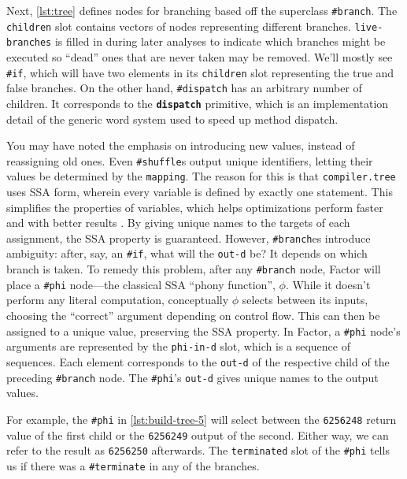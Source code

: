 

\begin{sloppypar}
Next, \vref{lst:tree} defines nodes for branching based off the superclass
\Verb|#branch|.  The \Verb|children| slot contains vectors of nodes
representing different branches.  \Verb|live-branches| is filled in during
later analyses to indicate which branches might be executed so ``dead'' ones
that are never taken may be removed.  We'll mostly see \Verb|#if|, which will
have two elements in its \Verb|children| slot representing the true and false
branches.  On the other hand, \Verb|#dispatch| has an arbitrary number of
children.  It corresponds to the \texttt{\textbf{dispatch}} primitive, which is
an implementation detail of the generic word system used to speed up method
dispatch.
\end{sloppypar}

You may have noted the emphasis on introducing new values, instead of
reassigning old ones.  Even \Verb|#shuffle|s output unique identifiers, letting
their values be determined by the \Verb|mapping|.  The reason for this is that
\Verb|compiler.tree| uses \gls{SSA} form, wherein every variable is defined by
exactly one statement.  This simplifies the properties of variables, which
helps optimizations perform faster and with better results \autocite{SSA}.  By
giving unique names to the targets of each assignment, the \gls{SSA} property
is guaranteed.  However, \Verb|#branch|es introduce ambiguity: after, say, an
\Verb|#if|, what will the \Verb|out-d| be?  It depends on which branch is
taken.  To remedy this problem, after any \Verb|#branch| node, Factor will
place a \Verb|#phi| node---the classical \gls{SSA} ``phony function'', $\phi$.
While it doesn't perform any literal computation, conceptually $\phi$ selects
between its inputs, choosing the ``correct'' argument depending on control
flow.  This can then be assigned to a unique value, preserving the \gls{SSA}
property.  In Factor, a \Verb|#phi| node's arguments are represented by the
\Verb|phi-in-d| slot, which is a sequence of sequences.  Each element
corresponds to the \Verb|out-d| of the respective child of the preceding
\Verb|#branch| node.  The \Verb|#phi|'s \Verb|out-d| gives unique names to the
output values.

For example, the \Verb|#phi| in \vref{lst:build-tree-5} will select between
the \Verb|6256248| return value of the first child or the \Verb|6256249|
output of the second.  Either way, we can refer to the result as
\Verb|6256250| afterwards.  The \Verb|terminated| slot of the \Verb|#phi|
tells us if there was a \Verb|#terminate| in any of the branches.

